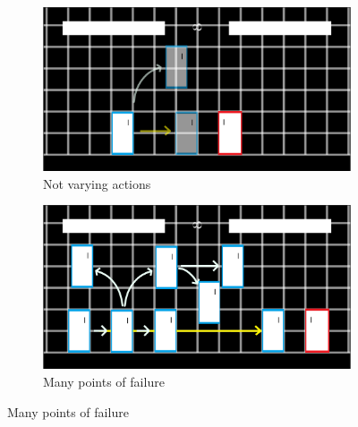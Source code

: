 \documentclass{article}
\begin{document}
\begin{figure}[h]
	\centering
	\begin{subfigure}[h]{0.4\textwidth}
		\centering
		\includegraphics[width=\textwidth]{LearningExample1.png}
		\caption{Not varying actions}
		\label{Learning1}
	\end{subfigure}
	\begin{subfigure}[h]{0.4\textwidth}
		\centering
		\includegraphics[width=\textwidth]{LearningExample2.png}
		\caption{Many points of failure}
		\label{Learning2}
	\end{subfigure}
\end{figure}


\end{document}
